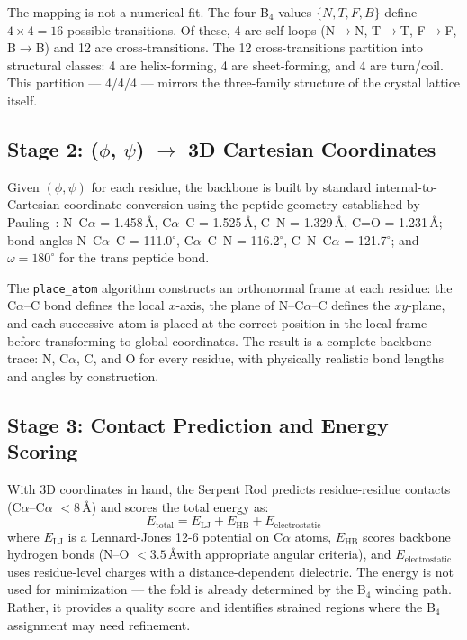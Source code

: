 \documentclass[11pt,a4paper,twocolumn]{article}
\begin{document}
The mapping is not a numerical fit. The four B$_4$ values $\{N, T, F, B\}$ define $4 \times 4 = 16$ possible transitions. Of these, 4 are self-loops (N$\to$N, T$\to$T, F$\to$F, B$\to$B) and 12 are cross-transitions. The 12 cross-transitions partition into structural classes: 4 are helix-forming, 4 are sheet-forming, and 4 are turn/coil. This partition — 4/4/4 — mirrors the three-family structure of the crystal lattice itself.

\subsection{Stage 2: ($\phi$, $\psi$) $\to$ 3D Cartesian Coordinates}

Given $(\phi, \psi)$ for each residue, the backbone is built by standard internal-to-Cartesian coordinate conversion using the peptide geometry established by Pauling~\cite{pauling1951}: N--C$\alpha$ = 1.458\,\AA, C$\alpha$--C = 1.525\,\AA, C--N = 1.329\,\AA, C=O = 1.231\,\AA; bond angles N--C$\alpha$--C = 111.0$^\circ$, C$\alpha$--C--N = 116.2$^\circ$, C--N--C$\alpha$ = 121.7$^\circ$; and $\omega = 180^\circ$ for the trans peptide bond.

The \texttt{place\_atom} algorithm constructs an orthonormal frame at each residue: the C$\alpha$--C bond defines the local $x$-axis, the plane of N--C$\alpha$--C defines the $xy$-plane, and each successive atom is placed at the correct position in the local frame before transforming to global coordinates. The result is a complete backbone trace: N, C$\alpha$, C, and O for every residue, with physically realistic bond lengths and angles by construction.

\subsection{Stage 3: Contact Prediction and Energy Scoring}

With 3D coordinates in hand, the Serpent Rod predicts residue-residue contacts (C$\alpha$--C$\alpha$ $< 8$\,\AA) and scores the total energy as:
\begin{equation}
E_{\text{total}} = E_{\text{LJ}} + E_{\text{HB}} + E_{\text{electrostatic}}
\end{equation}
where $E_{\text{LJ}}$ is a Lennard-Jones 12-6 potential on C$\alpha$ atoms, $E_{\text{HB}}$ scores backbone hydrogen bonds (N--O $< 3.5$\,\AA with appropriate angular criteria), and $E_{\text{electrostatic}}$ uses residue-level charges with a distance-dependent dielectric. The energy is not used for minimization — the fold is already determined by the B$_4$ winding path. Rather, it provides a quality score and identifies strained regions where the B$_4$ assignment may need refinement.
\end{document}
